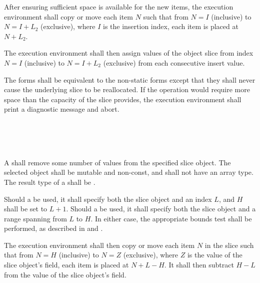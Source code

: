 \specsubsubitem
After ensuring sufficient space is available for the new items, the execution
environment shall copy or move each item $N$ such that from $N=I$ (inclusive)
to $N=I+L_2$ (exclusive), where $I$ is the insertion index, each item is placed
at $N+L_2$.

\specsubsubitem
The execution environment shall then assign values of the object slice from
index $N = I$ (inclusive) to $N = I+L_2$ (exclusive) from each consecutive
insert value.

\specsubsubitem
The  forms shall be equivalent to the non-static forms except
that they shall never cause the underlying slice to be reallocated. If the
operation would require more space than the capacity of the slice provides, the
execution environment shall print a diagnostic message and abort.


\begin{grammar}
 \\
	  \terminal{(}  \terminal{)} \\
	  \terminal{(}  \terminal{)} \\
\end{grammar}

\specsubsubitem
A  shall remove some number of values from the
specified slice object. The selected object shall be mutable and non-const, and
shall not have an array type. The result type of a
 shall be .

\specsubsubitem
Should a  be used, it shall specify both the
slice object and an index $L$, and $H$ shall be set to $L+1$. Should a
 be used, it shall specify both the slice object
and a range spanning from $L$ to $H$. In either case, the appropriate bounds
test shall be performed, as described in  and
.

\specsubsubitem
The execution environment shall then copy or move each item $N$ in the slice
such that from $N=H$ (inclusive) to $N=Z$ (exclusive), where $Z$ is the value of
the slice object's  field, each item is placed at $N+L-H$. It shall
then subtract $H-L$ from the value of the slice object's  field.


